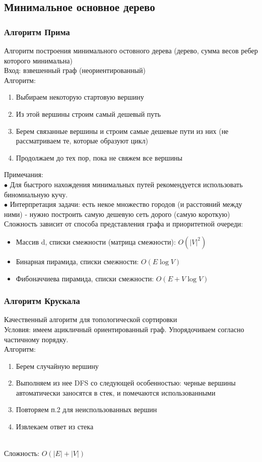 \documentclass[a4paper]{article}
\begin{document}
\subsection{Минимальное основное дерево}
\subsubsection{Алгоритм Прима}
Алгоритм построения минимального остовного дерева (дерево, сумма весов ребер которого минимальна) \\
Вход: взвешенный граф (неориентированный) \\
Алгоритм:
\begin{enumerate}
	\item Выбираем некоторую стартовую вершину
	\item Из этой вершины строим самый дешевый путь
	\item Берем связанные вершины и строим самые дешевые пути из них (не рассматриваем те, которые образуют цикл)
	\item Продолжаем до тех пор, пока не свяжем все вершины
\end{enumerate}
Примечания: \\
$\bullet$ Для быстрого нахождения минимальных путей рекомендуется использовать биномиальную кучу. \\
$\bullet$ Интерпретация задачи: есть некое множество городов (и расстояний между ними) - нужно построить самую дешевую сеть дорого (самую короткую) \\
Сложность зависит от способа представления графа и приоритетной очереди:
\begin{itemize}
	\item Массив d, списки смежности (матрица смежности): $O(|V|^2)$
	\item Бинарная пирамида, списки смежности: $O(E \log V)$
	\item Фибоначчиева пирамида, списки смежности: $O(E + V \log V)$
\end{itemize}
\subsubsection{Алгоритм Крускала}
Качественный алгоритм для топологической сортировки \\
Условия: имеем ацикличный ориентированный граф. Упорядочиваем согласно частичному порядку. \\
Алгоритм:
\begin{enumerate}
	\item Берем случайную вершину
	\item Выполняем из нее DFS со следующей особенностью: черные вершины автоматически заносятся в стек, и помечаются использованными
	\item Повторяем п.2 для неиспользованных вершин
	\item Извлекаем ответ из стека
\end{enumerate} \\
Сложность: $O(|E| + |V|)$
\end{document}
